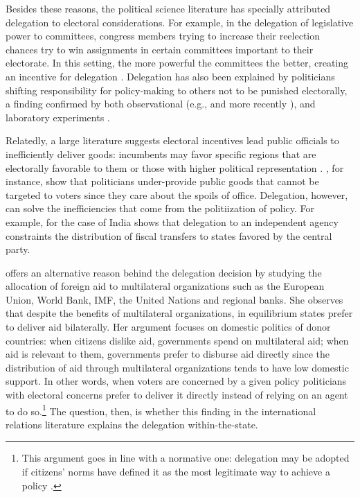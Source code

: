 \documentclass[12pt]{amsart}
\numberwithin{equation}{section}
\theoremstyle{definition}
\theoremstyle{definition}
\theoremstyle{definition}
\begin{document}

 Besides these reasons, the political science literature has specially attributed delegation to electoral considerations. For example, in the delegation of legislative power to committees, congress members trying to increase their reelection chances try to win assignments in certain committees important to their electorate. In this setting, the more powerful the committees the better, creating an incentive for delegation \citep{mccubbins_1991}. Delegation has also been explained by politicians shifting responsibility for policy-making to others not to be punished electorally, a finding confirmed by both observational (e.g., \citet{fiorina_1982} and more recently \citep{loftis_2014}),  and laboratory experiments \citep{bartling_fischbacher_2012}. 
 
 Relatedly, a large literature suggests electoral incentives lead public officials to inefficiently deliver goods: incumbents may favor specific regions that are electorally favorable to them \citep{schady_2000, Miguel_zaidi_2003, cole_2004} or those with higher political representation  \citep{wright_1974, porto_2001, ansolabehere_etal_2002}. \citet{lizzeri_2001}, for instance, show that politicians under-provide public goods that cannot be targeted to voters since they care about the spoils of office. Delegation, however, can solve the inefficiencies that come from the politiization of policy. For example, for the case of India \citet{khemani_2007} shows that delegation to an independent agency constraints the distribution of fiscal transfers to states favored by the central party.  
 
 \citet{milner_2004} offers an alternative reason behind the delegation decision by studying the allocation of foreign aid to multilateral organizations such as the European Union, World Bank, IMF, the United Nations and regional banks. She observes that despite the benefits of multilateral organizations, in equilibrium states prefer to deliver aid bilaterally. Her argument focuses on domestic politics of donor countries: when citizens dislike aid, governments spend on multilateral aid; when aid is relevant to them, governments prefer to disburse aid directly since the distribution of aid through multilateral organizations tends to have low domestic support. In other words, when voters are concerned by a given policy politicians with electoral concerns prefer to deliver it directly instead of relying on an agent to do so.\footnote{This argument goes in line with a normative one: delegation may be adopted if citizens’ norms have defined it as the most legitimate way to achieve a policy \citep{finnemore_1996, ruggie_1993, milner_2011}.} The question, then, is whether this finding in the international relations literature explains the delegation within-the-state. 
 
\end{document}

